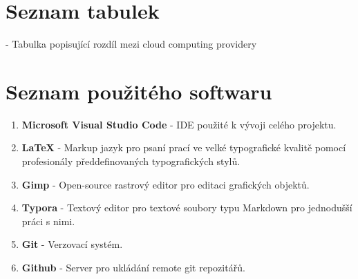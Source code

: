 \documentclass[12pt,a4paper]{report}
\begin{document}
  \chapter{Seznam tabulek}
   - Tabulka popisující rozdíl mezi cloud computing providery  \\
 
  \chapter{Seznam použitého softwaru}
    \begin{enumerate}
      \item \textbf{Microsoft Visual Studio Code} - IDE použité k vývoji celého projektu.   
      \item \textbf{LaTeX} - Markup jazyk pro psaní prací ve velké typografické kvalitě pomocí profesionály předdefinovaných typografických stylů.
      \item \textbf{Gimp} - Open-source rastrový editor pro editaci grafických objektů.
      \item \textbf{Typora} - Textový editor pro textové soubory typu Markdown pro jednodušší práci s nimi. 
      \item \textbf{Git} - Verzovací systém.
      \item \textbf{Github} - Server pro ukládání remote git repozitářů.
    \end{enumerate}
\end{document}
